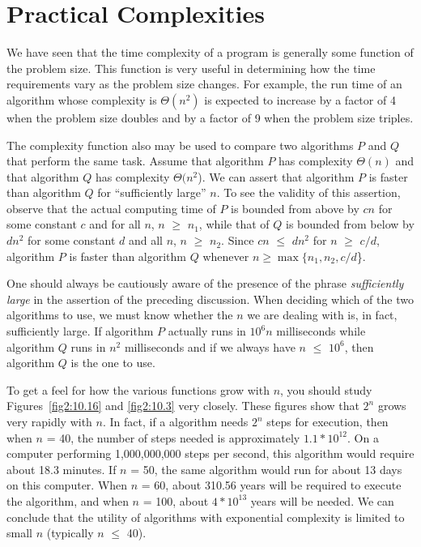 \section{Practical Complexities}
We have seen that the time complexity of a program
is generally some function of the problem
size.  This function is very useful in
determining how the time requirements vary as the
problem size changes.  For example, the run time of an algorithm
whose complexity is $\Theta(n^2)$ is expected to increase by a factor of 4
when the problem size doubles and by a factor of 9 when the problem
size triples.

The complexity
function also may be used to compare two algorithms $P$ and $Q$ that perform
the same task.  Assume that algorithm $P$ has complexity
$\Theta (n)$ and that algorithm $Q$ has complexity
$\Theta ( n^2$).  We can assert that 
algorithm $P$ is faster than algorithm $Q$
for ``sufficiently large'' $n$.  To see the validity of this assertion,
observe that the actual computing time of $P$ is bounded from above
by $cn$ for some constant $c$ and for all $n$, $n$ $\geq$ $n_1$, while that of
$Q$ is bounded from below by $dn^2$ for some constant $d$ and all $n$, $n$ $\geq$ $n_2$.
Since $cn$ $\leq$ $dn^2$ for $n$ $\geq$ $c / d$, algorithm $P$ is faster
than algorithm $Q$ whenever $n \geq \max\{
n_1 ,  n_2 ,  c / d$\}.
 
One should always be cautiously aware of the presence of the
phrase {\it sufficiently large} in the assertion of the preceding
discussion.  When
deciding which of the two algorithms to use, we must know whether
the $n$ we are dealing with is, in fact, sufficiently large.  If
algorithm $P$ actually runs in $10^6 n$ milliseconds while algorithm $Q$
runs in $n^ 2$ milliseconds
and if we always have $n$ $\leq$ $10^6$,
then algorithm $Q$ is the one to use.
 
To get a feel for how the various functions grow with $n$,
you should study Figures~\ref{fig2:10.16} and
\ref{fig2:10.3} very closely.  These figures show that
$2^n$ grows very rapidly with $n$.  In fact, if a algorithm needs
$2^n$ steps for execution, then when $n$ = 40,
the number of steps needed is approximately
$1.1 * 10^{12}$.  On a computer performing 1,000,000,000 steps per second,
this algorithm would require about 18.3 minutes.  If $n$ = 50, the same algorithm
would run for about 13 days on this computer.  When
$n$ = 60, about 310.56 years
will be required to execute the algorithm, and when $n$ = 100, about $4 * 10^{13}$
years will be needed.  We can conclude that the utility
of algorithms with exponential complexity is limited to small $n$
(typically $n$ $\leq$ 40).

